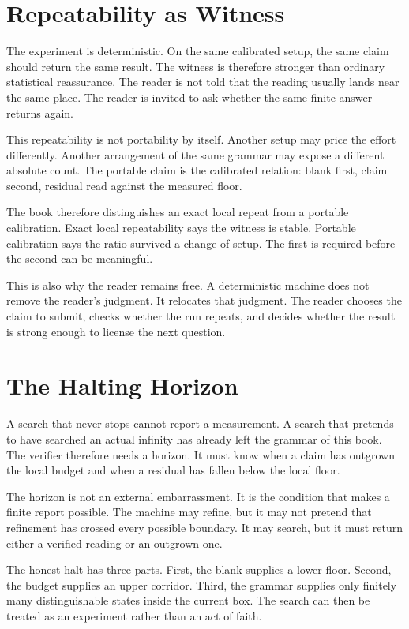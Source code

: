 \section{Repeatability as Witness}

The experiment is deterministic. On the same calibrated setup, the same claim
should return the same result. The witness is therefore stronger than ordinary
statistical reassurance. The reader is not told that the reading usually lands
near the same place. The reader is invited to ask whether the same finite
answer returns again.

This repeatability is not portability by itself. Another setup may price the
effort differently. Another arrangement of the same grammar may expose a
different absolute count. The portable claim is the calibrated relation: blank
first, claim second, residual read against the measured floor.

The book therefore distinguishes an exact local repeat from a portable
calibration. Exact local repeatability says the witness is stable. Portable
calibration says the ratio survived a change of setup. The first is required
before the second can be meaningful.

This is also why the reader remains free. A deterministic machine does not
remove the reader's judgment. It relocates that judgment. The reader chooses
the claim to submit, checks whether the run repeats, and decides whether the
result is strong enough to license the next question.

\section{The Halting Horizon}

A search that never stops cannot report a measurement. A search that pretends
to have searched an actual infinity has already left the grammar of this book.
The verifier therefore needs a horizon. It must know when a claim has outgrown
the local budget and when a residual has fallen below the local floor.

The horizon is not an external embarrassment. It is the condition that makes a
finite report possible. The machine may refine, but it may not pretend that
refinement has crossed every possible boundary. It may search, but it must
return either a verified reading or an outgrown one.

The honest halt has three parts. First, the blank supplies a lower floor.
Second, the budget supplies an upper corridor. Third, the grammar supplies only
finitely many distinguishable states inside the current box. The search can
then be treated as an experiment rather than an act of faith.

